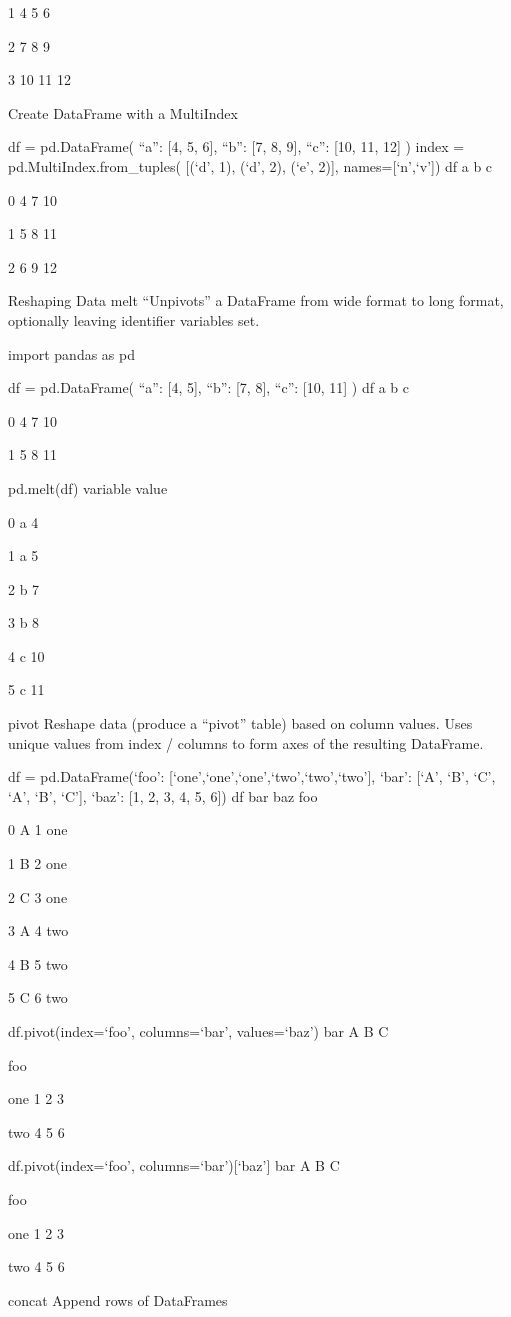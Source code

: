 1 4 5 6

2 7 8 9

3 10 11 12

Create DataFrame with a MultiIndex

df = pd.DataFrame({
“a”: [4, 5, 6],
“b”: [7, 8, 9],
“c”: [10, 11, 12]
})
index = pd.MultiIndex.from_tuples(
[(‘d’, 1), (‘d’, 2), (‘e’, 2)],
names=[‘n’,‘v’])
df
a b c

0 4 7 10

1 5 8 11

2 6 9 12

Reshaping Data
melt
“Unpivots” a DataFrame from wide format to long format, optionally leaving identifier variables set.

import pandas as pd

df = pd.DataFrame({
“a”: [4, 5],
“b”: [7, 8],
“c”: [10, 11]
})
df
a b c

0 4 7 10

1 5 8 11

pd.melt(df)
variable value

0 a 4

1 a 5

2 b 7

3 b 8

4 c 10

5 c 11

pivot
Reshape data (produce a “pivot” table) based on column values. Uses unique values from index / columns to form axes of the resulting DataFrame.

df = pd.DataFrame({‘foo’: [‘one’,‘one’,‘one’,‘two’,‘two’,‘two’],
‘bar’: [‘A’, ‘B’, ‘C’, ‘A’, ‘B’, ‘C’],
‘baz’: [1, 2, 3, 4, 5, 6]})
df
bar baz foo

0 A 1 one

1 B 2 one

2 C 3 one

3 A 4 two

4 B 5 two

5 C 6 two

df.pivot(index=‘foo’, columns=‘bar’, values=‘baz’)
bar A B C

foo

one 1 2 3

two 4 5 6

df.pivot(index=‘foo’, columns=‘bar’)[‘baz’]
bar A B C

foo

one 1 2 3

two 4 5 6

concat
Append rows of DataFrames

